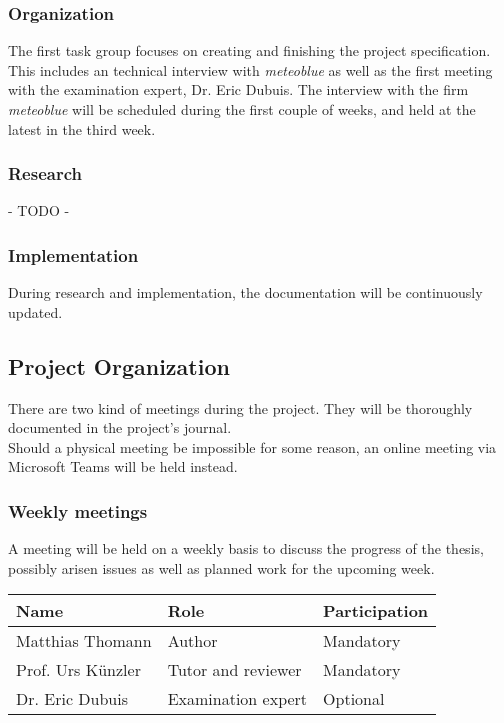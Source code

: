 
\clearpage
\subsubsection{Organization}
The first task group focuses on creating and finishing the project specification. This includes an technical interview with \emph{meteoblue} as well as the first meeting with the examination expert, Dr. Eric Dubuis.
The interview with the firm \emph{meteoblue} will be scheduled during the first couple of weeks, and held at the latest in the third week.

\subsubsection{Research}
\color{orange}
- TODO -
\color{black}

\subsubsection{Implementation}
\color{orange}
During research and implementation, the documentation will be continuously updated.
\color{black}

\subsection{Project Organization}
There are two kind of meetings during the project. They will be thoroughly documented in the project's journal.
\\
Should a physical meeting be impossible for some reason, an online meeting via Microsoft Teams will be held instead.

\subsubsection{Weekly meetings}
A meeting will be held on a weekly basis to discuss the progress of the thesis, possibly arisen issues as well as planned work for the upcoming week.
\emptyline
\noindent\begin{tabular}{|l|l|l|}
    \hline
    \textbf{Name}       & \textbf{Role}         & \textbf{Participation}\\ \hline
    Matthias Thomann    & Author                & Mandatory             \\ \hline
    Prof. Urs Künzler   & Tutor and reviewer    & Mandatory             \\ \hline
    Dr. Eric Dubuis     & Examination expert    & Optional              \\ \hline
\end{tabular}

